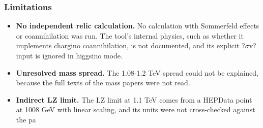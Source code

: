 \documentclass[11pt,a4paper]{article}
\begin{document}
\subsubsection*{Limitations}
\begin{itemize}
  \item \textbf{No independent relic calculation.} No calculation with Sommerfeld effects or coannihilation was run. The tool's internal physics, such as whether it implements chargino coannihilation, is not documented, and its explicit ?$\sigma$v? input is ignored in higgsino mode.
  \item \textbf{Unresolved mass spread.} The 1.08-1.2 TeV spread could not be explained, because the full texts of the mass papers were not read.
  \item \textbf{Indirect LZ limit.} The LZ limit at 1.1 TeV comes from a HEPData point at 1008 GeV with linear scaling, and its units were not cross-checked against the pa
\end{itemize}
\end{document}
